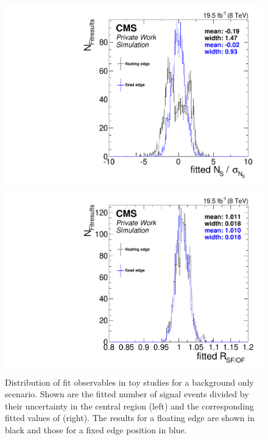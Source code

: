 \begin{figure}[hbp]
  \centering
  \begin{minipage}[t]{0.49\textwidth}
    \includegraphics[width=\textwidth]{plots/results/fit/toyResults/nS_floatVsFixed.pdf}
  \end{minipage}
  \begin{minipage}[t]{0.49\textwidth}
    \includegraphics[width=\textwidth]{plots/results/fit/toyResults/rSFOF_floatVsFixed.pdf}
  \end{minipage}

  \caption{Distribution of fit observables in toy studies for a background only scenario. Shown are the fitted number of signal events divided by their uncertainty in the central region (left) and the corresponding fitted values of \Rsfof (right). The results for a floating edge are shown in black and those for a fixed edge position in blue.}
  \label{fig:toys:backgroundOnly}
\end{figure}

